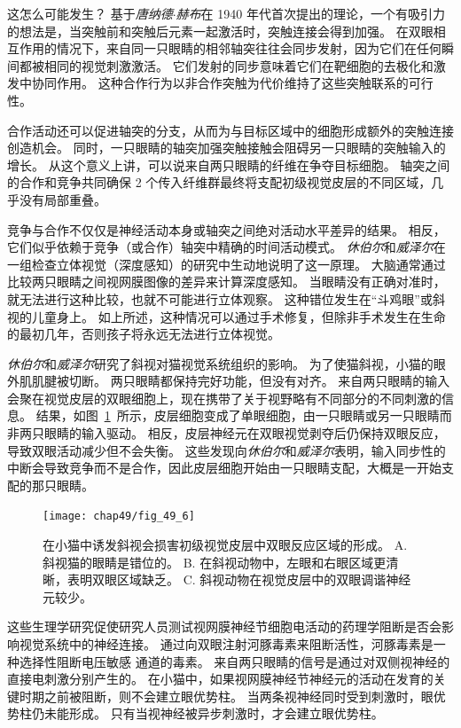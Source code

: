 这怎么可能发生？
基于\textit{唐纳德$\cdot$赫布}在 1940 年代首次提出的理论，一个有吸引力的想法是，当突触前和突触后元素一起激活时，突触连接会得到加强。
在双眼相互作用的情况下，来自同一只眼睛的相邻轴突往往会同步发射，因为它们在任何瞬间都被相同的视觉刺激激活。
它们发射的同步意味着它们在靶细胞的去极化和激发中协同作用。
这种合作行为以非合作突触为代价维持了这些突触联系的可行性。


合作活动还可以促进轴突的分支，从而为与目标区域中的细胞形成额外的突触连接创造机会。
同时，一只眼睛的轴突加强突触接触会阻碍另一只眼睛的突触输入的增长。
从这个意义上讲，可以说来自两只眼睛的纤维在争夺目标细胞。
轴突之间的合作和竞争共同确保 2 个传入纤维群最终将支配初级视觉皮层的不同区域，几乎没有局部重叠。


竞争与合作不仅仅是神经活动本身或轴突之间绝对活动水平差异的结果。
相反，它们似乎依赖于竞争（或合作）轴突中精确的时间活动模式。
\textit{休伯尔}和\textit{威泽尔}在一组检查立体视觉（深度感知）的研究中生动地说明了这一原理。
大脑通常通过比较两只眼睛之间视网膜图像的差异来计算深度感知。
当眼睛没有正确对准时，就无法进行这种比较，也就不可能进行立体观察。
这种错位发生在“斗鸡眼”或斜视的儿童身上。
如上所述，这种情况可以通过手术修复，但除非手术发生在生命的最初几年，否则孩子将永远无法进行立体视觉。


\textit{休伯尔}和\textit{威泽尔}研究了斜视对猫视觉系统组织的影响。
为了使猫斜视，小猫的眼外肌肌腱被切断。 两只眼睛都保持完好功能，但没有对齐。
来自两只眼睛的输入会聚在视觉皮层的双眼细胞上，现在携带了关于视野略有不同部分的不同刺激的信息。
结果，如图~\ref{fig:49_6}~所示，皮层细胞变成了单眼细胞，由一只眼睛或另一只眼睛而非两只眼睛的输入驱动。 
相反，皮层神经元在双眼视觉剥夺后仍保持双眼反应，导致双眼活动减少但不会失衡。
这些发现向\textit{休伯尔}和\textit{威泽尔}表明，输入同步性的中断会导致竞争而不是合作，因此皮层细胞开始由一只眼睛支配，大概是一开始支配的那只眼睛。


\begin{figure}[htbp]
	\centering
	\texttt{[image: chap49/fig\_49\_6]}
	\caption{在小猫中诱发斜视会损害初级视觉皮层中双眼反应区域的形成。
		A. 斜视猫的眼睛是错位的。
		B. 在斜视动物中，左眼和右眼区域更清晰，表明双眼区域缺乏。
		C. 斜视动物在视觉皮层中的双眼调谐神经元较少。}
	\label{fig:49_6}
\end{figure}


这些生理学研究促使研究人员测试视网膜神经节细胞电活动的药理学阻断是否会影响视觉系统中的神经连接。
通过向双眼注射河豚毒素来阻断活性，河豚毒素是一种选择性阻断电压敏感  通道的毒素。
来自两只眼睛的信号是通过对双侧视神经的直接电刺激分别产生的。
在小猫中，如果视网膜神经节神经元的活动在发育的关键时期之前被阻断，则不会建立眼优势柱。
当两条视神经同时受到刺激时，眼优势柱仍未能形成。
只有当视神经被异步刺激时，才会建立眼优势柱。


